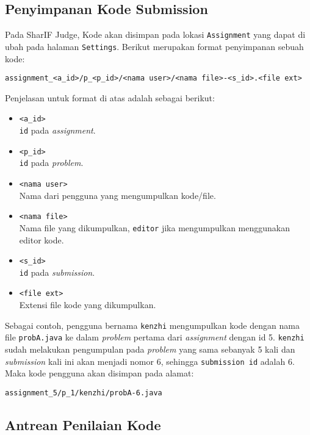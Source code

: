 \subsection{Penyimpanan Kode Submission}
\label{sec:3:1:penyimpanankode}
Pada SharIF Judge, Kode akan disimpan pada lokasi \verb|Assignment| yang dapat di ubah pada halaman \verb|Settings|. Berikut merupakan format penyimpanan sebuah kode:

\begin{center}
      \verb|assignment_<a_id>/p_<p_id>/<nama user>/<nama file>-<s_id>.<file ext>|
\end{center}

Penjelasan untuk format di atas adalah sebagai berikut:

\begin{itemize}
      \item \verb|<a_id>| \\
            \verb|id| pada \textit{assignment}.
      \item \verb|<p_id>| \\
            \verb|id| pada \textit{problem}.
      \item \verb|<nama user>| \\
            Nama dari pengguna yang mengumpulkan kode/file.
      \item \verb|<nama file>| \\
            Nama file yang dikumpulkan, \verb|editor| jika mengumpulkan menggunakan editor kode.
      \item \verb|<s_id>| \\
            \verb|id| pada \textit{submission}.
      \item \verb|<file ext>| \\
            Extensi file kode yang dikumpulkan.
\end{itemize}

Sebagai contoh, pengguna bernama \verb|kenzhi| mengumpulkan kode dengan nama file \verb|probA.java| ke dalam \textit{problem} pertama dari \textit{assignment} dengan id 5. \verb|kenzhi| sudah melakukan pengumpulan pada \textit{problem} yang sama sebanyak 5 kali dan \textit{submission} kali ini akan menjadi nomor 6, sehingga \verb|submission id| adalah 6. Maka kode pengguna akan disimpan pada alamat:

\begin{center}
      \verb|assignment_5/p_1/kenzhi/probA-6.java|
\end{center}

\subsection{Antrean Penilaian Kode}
\label{sec:3:1:antreanpenilaiankode}

